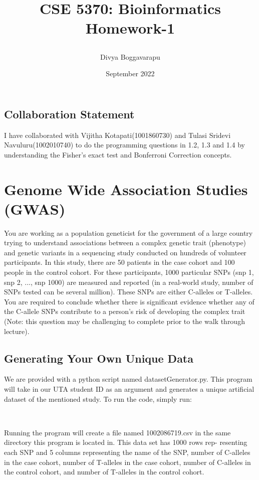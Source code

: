 \documentclass{article}
\title{\begin{center}CSE 5370: Bioinformatics Homework-1\end{center}}
\author{Divya Boggavarapu}
\date{September 2022}
\begin{document}
\maketitle

\subsection*{Collaboration Statement}
I have collaborated with Vijitha Kotapati(1001860730) and Tulasi Sridevi Navuluru(1002010740) to do the programming questions in 1.2, 1.3 and 1.4  by understanding the Fisher's exact test and Bonferroni Correction concepts.

\section{Genome Wide Association Studies (GWAS)}

You are working as a population geneticist for the government of a large country
trying to understand associations between a complex genetic trait (phenotype)
and genetic variants in a sequencing study conducted on hundreds of volunteer
participants.
  In this study, there are 50 patients in the case cohort and 100 people in the
control cohort. For these participants, 1000 particular SNPs (snp 1, snp 2, ...,
snp 1000) are measured and reported (in a real-world study, number of SNPs
tested can be several million). These SNPs are either C-alleles or T-alleles. You
are required to conclude whether there is significant evidence whether any of
the C-allele SNPs contribute to a person’s risk of developing the complex trait
(Note: this question may be challenging to complete prior to the walk through
lecture).


\subsection{Generating Your Own Unique Data}
We are provided with a python script named datasetGenerator.py. This program will take in our UTA student ID as an argument and generates a unique artificial dataset of the mentioned study. To run the code, simply run:
\begin{itemize}
\\
\end{itemize}

Running the program will create a file named 1002086719.csv in the same directory this program is located in. This data set has 1000 rows rep- resenting each SNP and 5 columns representing the name of the SNP, number of C-alleles in the case cohort, number of T-alleles in the case cohort, number of C-alleles in the control cohort, and number of T-alleles in the control cohort.
 
\end{document}
